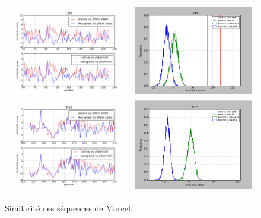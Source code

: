\documentclass[a4paper,12pt]{article}
\begin{document}
   \begin{figure}[t]
     \centering
     \begin{tabular}{cc}
       \includegraphics[width=8.45cm]{marcel_seq/1ZFP/graph_simil_bypos.png} &
       \includegraphics[width=8.45cm]{marcel_seq/1ZFP/graph_simil_byseq.png} \\
       \includegraphics[width=8.45cm]{marcel_seq/2FE5/graph_simil_bypos.png} &
       \includegraphics[width=8.45cm]{marcel_seq/2FE5/graph_simil_byseq.png} \\

     \end{tabular}

     \caption{Similarité des séquences de Marcel.}

   \end{figure}
\end{document}

